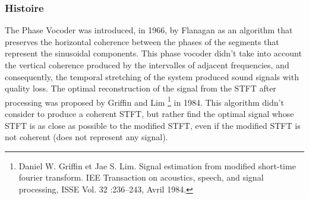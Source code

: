 
        \subsubsection{Histoire} 

The Phase Vocoder was introduced, in 1966, by Flanagan as an algorithm that preserves the horizontal coherence between the phases of the segments that represent the sinusoidal components. This phase vocoder didn't take into account the vertical coherence produced by the intervalles of adjacent frequencies, and consequently, the temporal stretching of the system produced sound signals with quality loss. The optimal reconstruction of the signal from the STFT after processing was proposed by Griffin and Lim \footnote{Daniel W. Griffin et Jae S. Lim. Signal estimation from modified short-time fourier transform. IEE Transaction on acoustics, speech, and signal processing, ISSE Vol. 32 :236–243, Avril 1984.} in 1984. This algorithm didn't consider to produce a coherent STFT, but rather find the optimal signal whose STFT is as close as possible to the modified STFT, even if the modified STFT is not coherent (does not represent any signal). 
  


